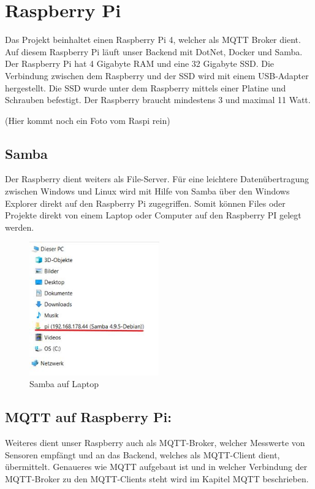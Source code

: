 \section{Raspberry Pi}

Das Projekt beinhaltet einen Raspberry Pi 4, welcher als MQTT Broker dient. Auf diesem Raspberry Pi läuft unser Backend mit DotNet, Docker und Samba.
Der Raspberry Pi hat 4 Gigabyte RAM und eine 32 Gigabyte SSD. 
Die Verbindung zwischen dem Raspberry und der SSD wird mit einem USB-Adapter hergestellt. 
Die SSD wurde unter dem Raspberry mittels einer Platine und Schrauben befestigt. 
Der Raspberry braucht mindestens 3 und maximal 11 Watt. 

(Hier kommt noch ein Foto vom Raspi rein)

\subsection{Samba}
Der Raspberry dient weiters als File-Server. Für eine leichtere Datenübertragung zwischen Windows und Linux wird mit Hilfe von Samba über den Windows Explorer direkt auf den Raspberry Pi zugegriffen.
Somit können Files oder Projekte direkt von einem Laptop oder Computer auf den Raspberry PI gelegt werden.

\begin{figure}[H]
    \centering
    \includegraphics[width=0.5\textwidth]{pics/RaspberrySamba.JPG}
    \caption{Samba auf Laptop}
\end{figure}



\subsection {MQTT auf Raspberry Pi:}
Weiteres dient unser Raspberry auch als MQTT-Broker, welcher Messwerte von Sensoren empfängt und an das Backend, welches als MQTT-Client dient, übermittelt. 
Genaueres wie MQTT aufgebaut ist und in welcher Verbindung der MQTT-Broker zu den MQTT-Clients steht wird im Kapitel MQTT beschrieben.

